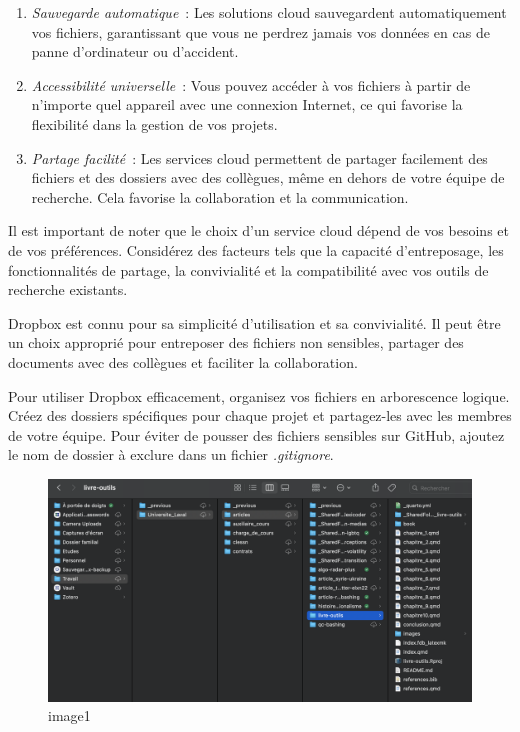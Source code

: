\documentclass[
  letterpaper,
]{scrbook}
\begin{document}
\begin{enumerate}
\def\labelenumi{\arabic{enumi}.}
\item
  \emph{Sauvegarde automatique}~: Les solutions cloud sauvegardent
  automatiquement vos fichiers, garantissant que vous ne perdrez jamais
  vos données en cas de panne d'ordinateur ou d'accident.
\item
  \emph{Accessibilité universelle}~: Vous pouvez accéder à vos fichiers
  à partir de n'importe quel appareil avec une connexion Internet, ce
  qui favorise la flexibilité dans la gestion de vos projets.
\item
  \emph{Partage facilité}~: Les services cloud permettent de partager
  facilement des fichiers et des dossiers avec des collègues, même en
  dehors de votre équipe de recherche. Cela favorise la collaboration et
  la communication.
\end{enumerate}

Il est important de noter que le choix d'un service cloud dépend de vos
besoins et de vos préférences. Considérez des facteurs tels que la
capacité d'entreposage, les fonctionnalités de partage, la convivialité
et la compatibilité avec vos outils de recherche existants.

Dropbox est connu pour sa simplicité d'utilisation et sa convivialité.
Il peut être un choix approprié pour entreposer des fichiers non
sensibles, partager des documents avec des collègues et faciliter la
collaboration.

Pour utiliser Dropbox efficacement, organisez vos fichiers en
arborescence logique. Créez des dossiers spécifiques pour chaque projet
et partagez-les avec les membres de votre équipe. Pour éviter de pousser
des fichiers sensibles sur GitHub, ajoutez le nom de dossier à exclure
dans un fichier \emph{.gitignore}.

\begin{figure}

{\centering \includegraphics{images/chapitre8_dropbox.png}

}

\caption{image1}

\end{figure}
\end{document}
